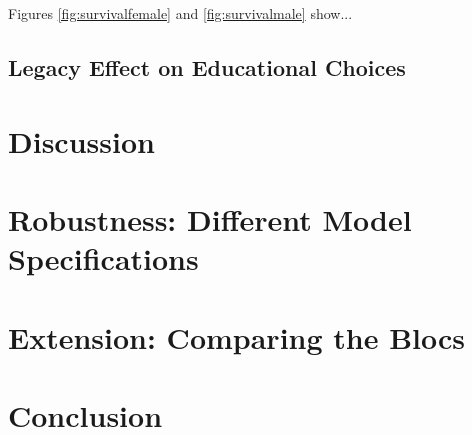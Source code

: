 \documentclass[a4paper, oneside, hyperfootnotes = false]{article}
\begin{document}
{Figures \ref{fig:survivalfemale} and \ref{fig:survivalmale} show...

\subsection{Legacy Effect on Educational Choices}
\label{educational}

\section{Discussion}
\label{discussion}

\section{Robustness: Different Model Specifications}
\label{robustness}

\section{Extension: Comparing the Blocs}
\label{Extension}

\section{Conclusion}
\label{conclusion}


{}

\makeatletter %


\label{references}

\makeatother

\vspace{-.3cm}

\clearpage

}
\end{document}
